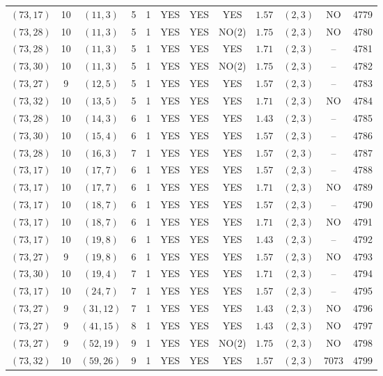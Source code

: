 \begin{longtable}{|c|c|c|c|c|c|c|c|c|c|c|c|}
$(73,17)$ & 10 & $(11,3)$ & 5 & 1 & YES & YES & YES & $1.57$ & $(2,3)$ & NO & 4779\\
$(73,28)$ & 10 & $(11,3)$ & 5 & 1 & YES & YES & NO(2) & $1.75$ & $(2,3)$ & NO & 4780\\
$(73,28)$ & 10 & $(11,3)$ & 5 & 1 & YES & YES & YES & $1.71$ & $(2,3)$ & -- & 4781\\
$(73,30)$ & 10 & $(11,3)$ & 5 & 1 & YES & YES & NO(2) & $1.75$ & $(2,3)$ & -- & 4782\\
$(73,27)$ & 9 & $(12,5)$ & 5 & 1 & YES & YES & YES & $1.57$ & $(2,3)$ & -- & 4783\\
$(73,32)$ & 10 & $(13,5)$ & 5 & 1 & YES & YES & YES & $1.71$ & $(2,3)$ & NO & 4784\\
$(73,28)$ & 10 & $(14,3)$ & 6 & 1 & YES & YES & YES & $1.43$ & $(2,3)$ & -- & 4785\\
$(73,30)$ & 10 & $(15,4)$ & 6 & 1 & YES & YES & YES & $1.57$ & $(2,3)$ & -- & 4786\\
$(73,28)$ & 10 & $(16,3)$ & 7 & 1 & YES & YES & YES & $1.57$ & $(2,3)$ & -- & 4787\\
$(73,17)$ & 10 & $(17,7)$ & 6 & 1 & YES & YES & YES & $1.57$ & $(2,3)$ & -- & 4788\\
$(73,17)$ & 10 & $(17,7)$ & 6 & 1 & YES & YES & YES & $1.71$ & $(2,3)$ & NO & 4789\\
$(73,17)$ & 10 & $(18,7)$ & 6 & 1 & YES & YES & YES & $1.57$ & $(2,3)$ & -- & 4790\\
$(73,17)$ & 10 & $(18,7)$ & 6 & 1 & YES & YES & YES & $1.71$ & $(2,3)$ & NO & 4791\\
$(73,17)$ & 10 & $(19,8)$ & 6 & 1 & YES & YES & YES & $1.43$ & $(2,3)$ & -- & 4792\\
$(73,27)$ & 9 & $(19,8)$ & 6 & 1 & YES & YES & YES & $1.57$ & $(2,3)$ & NO & 4793\\
$(73,30)$ & 10 & $(19,4)$ & 7 & 1 & YES & YES & YES & $1.71$ & $(2,3)$ & -- & 4794\\
$(73,17)$ & 10 & $(24,7)$ & 7 & 1 & YES & YES & YES & $1.57$ & $(2,3)$ & -- & 4795\\
$(73,27)$ & 9 & $(31,12)$ & 7 & 1 & YES & YES & YES & $1.43$ & $(2,3)$ & NO & 4796\\
$(73,27)$ & 9 & $(41,15)$ & 8 & 1 & YES & YES & YES & $1.43$ & $(2,3)$ & NO & 4797\\
$(73,27)$ & 9 & $(52,19)$ & 9 & 1 & YES & YES & NO(2) & $1.75$ & $(2,3)$ & NO & 4798\\
$(73,32)$ & 10 & $(59,26)$ & 9 & 1 & YES & YES & YES & $1.57$ & $(2,3)$ & 7073 & 4799\\

\end{longtable}
